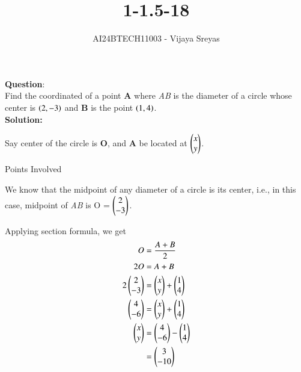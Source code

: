 \documentclass[journal]{IEEEtran}
\begin{document}

\vspace{3cm}

\title{1-1.5-18}
\author{AI24BTECH11003 - Vijaya Sreyas
}
{\let\newpage\relax\maketitle}

\renewcommand{\thefigure}{\theenumi}
\renewcommand{\thetable}{\theenumi}
\setlength{\intextsep}{10pt} %


\renewcommand{\thetable}{\theenumi}


\textbf{Question}:\\
Find the coordinated of a point \textbf{A} where \textit{AB} is the diameter of a circle whose center is $\left(2, -3\right)$ and \textbf{B} is the point $\left(1, 4\right)$.\\

\textbf{Solution: }

Say center of the circle is \textbf{O}, and \textbf{A} be located at $\begin{pmatrix}x \\ y\end{pmatrix}$.

\begin{table}[h!]    
  \centering
  
  \caption{Points Involved}
  \label{tab10.5.3.9.1}
\end{table}
We know that the midpoint of any diameter of a circle is its center, i.e., in this case, midpoint of \textit{AB} is O = $\begin{pmatrix}2 \\ -3\end{pmatrix}$.

Applying section formula, we get
\begin{align}
	O &= \frac{A+B}{2} \\
	2O &= A+B \\
	2 \begin{pmatrix}2 \\ -3\end{pmatrix} &= \begin{pmatrix}x \\ y\end{pmatrix} + \begin{pmatrix}1 \\ 4\end{pmatrix} \\
	\begin{pmatrix}4 \\ -6\end{pmatrix} &= \begin{pmatrix}x \\ y\end{pmatrix} + \begin{pmatrix}1 \\ 4\end{pmatrix} \\
	\begin{pmatrix}x \\ y\end{pmatrix} &= \begin{pmatrix}4 \\ -6\end{pmatrix} - \begin{pmatrix}1 \\ 4\end{pmatrix} \\
	&= \begin{pmatrix}3 \\ -10\end{pmatrix}
\end{align}
\end{document}
